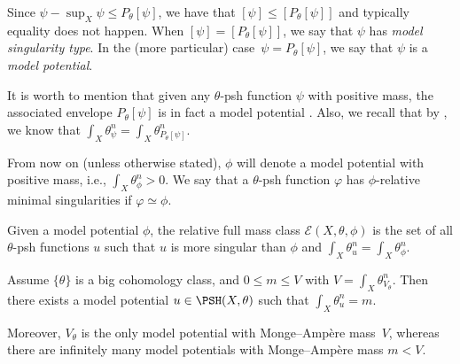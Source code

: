 Since $\psi - \sup_X \psi \leq P_\theta[\psi]$, we have that $[\psi] \leq [P_\theta[\psi]]$ and typically equality does not happen. When $[\psi] = [P_\theta[\psi]]$, we say that $\psi$ has \emph{model singularity type}. In the (more particular) case~${\psi = P_\theta[\psi]}$, we say that $\psi$ is a \emph{model potential}.

It is worth to mention that given any $\theta$-psh function $\psi$ with positive mass, the associated envelope $P_\theta[\psi]$ is in fact a model potential \cite[Theorem~3.14]{DDL6}.
Also, we recall that by \cite[Remark~3.4]{DDL6}, we know that $\int_X \theta_\psi^n = \int_X \theta_{P_\theta[\psi]}^n$.

From now on (unless otherwise stated), $\phi$ will denote a model potential with positive mass, i.e., $\int_X \theta_\phi^n>0$. We say that a $\theta$-psh function $\varphi$ has $\phi$-relative minimal singularities if $\varphi \simeq \phi$.

\begin{Definition}
Given a model potential $\phi$, the relative full mass class $\mathcal{E}(X,\theta,\phi)$ is the set of all $\theta$-psh functions $u$ such that $u$ is more singular than $\phi$ and $\int_X \theta_u^n=\int_X \theta_{\phi}^n$.
\end{Definition}

\begin{Proposition}\label{mass}
Assume $\{ \theta \}$ is a big cohomology class, and $0 \leq m \leq V$ with $V = \int_X \theta_{V_\theta}^n$. Then there exists a model potential $ u \in \PSH(X,\theta)$ such that $\int_X \theta_u^n = m$.

Moreover, $V_\theta$ is the only model potential with Monge--Amp\`ere mass~$V$, whereas there are infinitely many model potentials with Monge--Amp\`ere mass $m < V$.
\end{Proposition}

